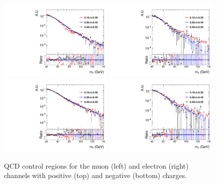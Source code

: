 \begin{figure}[htbp]
\centering
\includegraphics[width=0.49\textwidth]{plots/W/mt_qcd_shape_muon_wp.pdf}
\includegraphics[width=0.49\textwidth]{plots/W/mt_qcd_shape_electron_wp.pdf}
\includegraphics[width=0.49\textwidth]{plots/W/mt_qcd_shape_muon_wm.pdf}
\includegraphics[width=0.49\textwidth]{plots/W/mt_qcd_shape_electron_wm.pdf}
\caption{QCD control regions for the muon (left) and electron (right) channels with positive  (top) and negative (bottom) charges.}
\label{fig:qcd:control}
\end{figure}